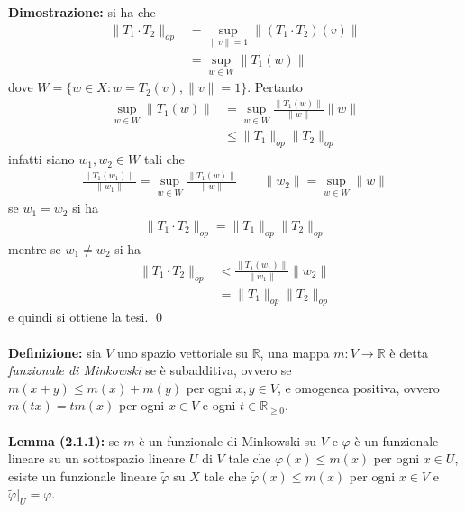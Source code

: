 \documentclass{article}
\numberwithin{equation}{subsection}
\begin{document}
\textbf{Dimostrazione:} si ha che
\begin{align*}
    \|T_1\cdot T_2\|_{op} &= \sup_{\|v\| = 1}\|(T_1\cdot T_2)(v)\|  \\
    &= \sup_{w \in W}\|T_1(w)\| 
\end{align*}
dove $W = \{w \in X : w = T_2(v), \|v\| = 1\}$. Pertanto
\begin{align*}
    \sup_{w \in W}\|T_1(w)\| &= \sup_{w \in W}\frac{\|T_1(w)\|}{\|w\|}\|w\|  \\
    &\leq \|T_1\|_{op}\|T_2\|_{op} 
\end{align*}
infatti siano $w_1, w_2 \in W$ tali che
\begin{align*}
    \frac{\|T_1(w_1)\|}{\|w_1\|} = \sup_{w \in W}\frac{\|T_1(w)\|}{\|w\|} \qquad \|w_2\| = \sup_{w \in W}\|w\| 
\end{align*}
se $w_1 = w_2$ si ha
\begin{align*}
    \|T_1 \cdot T_2\|_{op} = \|T_1\|_{op}\|T_2\|_{op} 
\end{align*}
mentre se $w_1 \neq w_2$ si ha
\begin{align*}
    \|T_1 \cdot T_2\|_{op} &< \frac{\|T_1(w_1)\|}{\|w_1\|}\|w_2\|  \\
    &= \|T_1\|_{op}\|T_2\|_{op} 
\end{align*}
e quindi si ottiene la tesi. \qed \\ \\
\textbf{Definizione:} sia $V$ uno spazio vettoriale su $\mathbb{R}$, una mappa $m : V \longrightarrow \mathbb{R}$ è detta \textit{funzionale di Minkowski} se è subadditiva, ovvero se $m(x + y) \leq m(x) + m(y)$ per ogni $x,y \in V$, e omogenea positiva, ovvero $m(tx) = tm(x)$ per ogni $x \in V$ e ogni $t \in \mathbb{R}_{\geq 0}$. \\ \\
\textbf{Lemma (2.1.1):} se $m$ è un funzionale di Minkowski su $V$ e $\varphi$ è un funzionale lineare su un sottospazio lineare $U$ di $V$ tale che $\varphi(x) \leq m(x)$ per ogni $x \in U$, esiste un funzionale lineare $\widetilde{\varphi}$ su $X$ tale che $\widetilde{\varphi}(x) \leq m(x)$ per ogni $x \in V$ e $\widetilde{\varphi}|_{U} = \varphi$. \\
\end{document}
